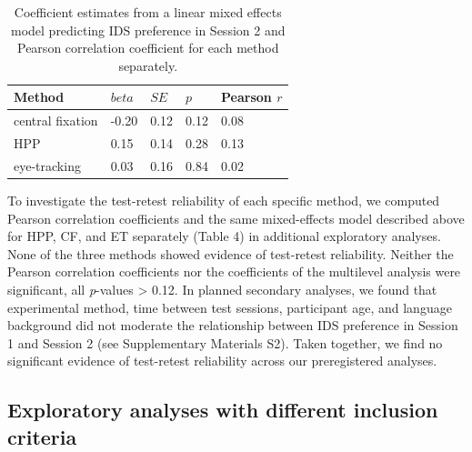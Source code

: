 \documentclass[
  man,floatsintext]{apa6}
\begin{document}
\begin{table}[tbp]

\begin{center}
\begin{threeparttable}

\caption{\label{tab:unnamed-chunk-7}Coefficient estimates from a linear mixed effects model predicting IDS preference in Session 2 and Pearson correlation coefficient for each method separately.}

\begin{tabular}{lllll}
\toprule
Method & $beta$ & $SE$ & $p$ & Pearson $r$\\
\midrule
central fixation & -0.20 & 0.12 & 0.12 & 0.08\\
HPP & 0.15 & 0.14 & 0.28 & 0.13\\
eye-tracking & 0.03 & 0.16 & 0.84 & 0.02\\
\bottomrule
\end{tabular}

\end{threeparttable}
\end{center}

\end{table}

To investigate the test-retest reliability of each specific method, we computed Pearson correlation coefficients and the same mixed-effects model described above for HPP, CF, and ET separately (Table 4) in additional exploratory analyses.
None of the three methods showed evidence of test-retest reliability.
Neither the Pearson correlation coefficients nor the coefficients of the multilevel analysis were significant, all \emph{p}-values \textgreater{} 0.12.
In planned secondary analyses, we found that experimental method, time between test sessions, participant age, and language background did not moderate the relationship between IDS preference in Session 1 and Session 2 (see Supplementary Materials S2).
Taken together, we find no significant evidence of test-retest reliability across our preregistered analyses.

\hypertarget{exploratory-analyses-with-different-inclusion-criteria}{%
\subsection{Exploratory analyses with different inclusion criteria}\label{exploratory-analyses-with-different-inclusion-criteria}}
\end{document}
